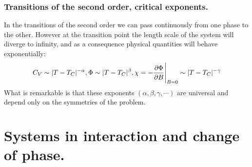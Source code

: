 \documentclass[10pt,a4paper]{book}
\begin{document}
\subsection{Transitions of the second order, critical exponents.}
In the transitions of the second order we can pass continuously from one phase to the other. However at the transition point the length scale of the system will diverge to infinity, and as a consequence physical quantities will behave exponentially:
\[
C_V \sim |T - T_C|^{-\alpha}, \Phi \sim |T - T_C|^\beta, \chi = - \pdv{\Phi}{B} \Bigg|_{B = 0} \sim |T - T_C|^{-\gamma}
\]
What is remarkable is that these exponents $(\alpha, \beta, \gamma, \cdots)$ are universal and depend only on the symmetries of the problem.

\chapter{Systems in interaction and change of phase.}
\end{document}
